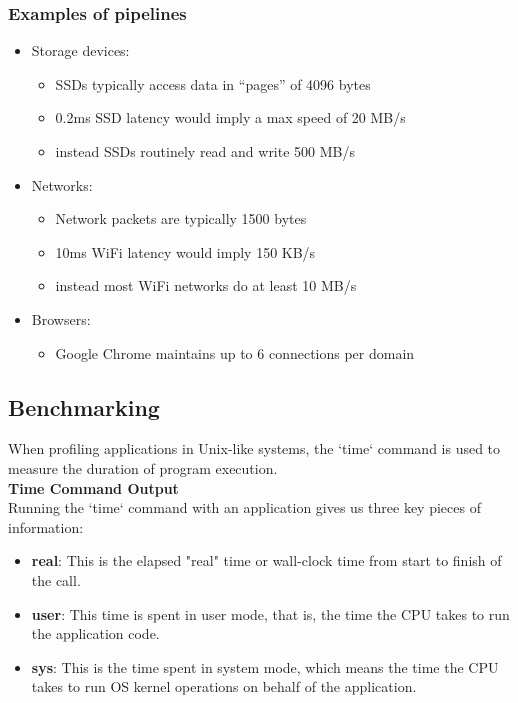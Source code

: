 \documentclass[12pt]{article}
\begin{document}
\subsubsection{Examples of pipelines}
\begin{itemize}
\item Storage devices:
\begin{itemize}
    \item SSDs typically access data in “pages” of 4096 bytes
    \item 0.2ms SSD latency would imply a max speed of 20 MB/s
    \item instead SSDs routinely read and write 500 MB/s
\end{itemize}
\item Networks:
\begin{itemize}
    \item Network packets are typically 1500 bytes
    \item 10ms WiFi latency would imply 150 KB/s
    \item instead most WiFi networks do at least 10 MB/s
\end{itemize}
\item Browsers:
\begin{itemize}
    \item Google Chrome maintains up to 6 connections per domain
\end{itemize}
\end{itemize}



\subsection{Benchmarking}

When profiling applications in Unix-like systems, the `time` command is used to measure the duration of program execution.\\

\textbf{Time Command Output}\\
Running the `time` command with an application gives us three key pieces of information:
\begin{itemize}
    \item \textbf{real}: This is the elapsed "real" time or wall-clock time from start to finish of the call.
    \item \textbf{user}: This time is spent in user mode, that is, the time the CPU takes to run the application code.
    \item \textbf{sys}: This is the time spent in system mode, which means the time the CPU takes to run OS kernel operations on behalf of the application.
\end{itemize}
\end{document}
